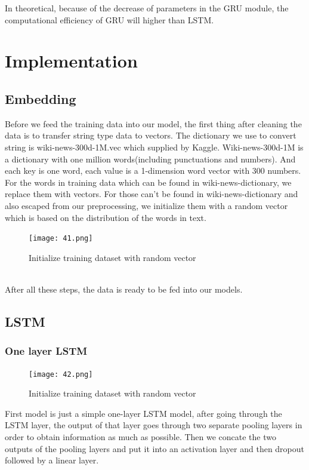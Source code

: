 \documentclass{article}
\begin{document}
\noindent In theoretical, because of the decrease of parameters in the GRU module, the computational efficiency of GRU will higher than LSTM. \\

\section{ Implementation}
\subsection{Embedding}
\noindent Before we feed the training data into our model, the first thing after cleaning the data is to transfer string type data to vectors. The dictionary we use to convert string is wiki-news-300d-1M.vec which supplied by Kaggle. Wiki-news-300d-1M is a dictionary with one million words(including punctuations and numbers). And each key is one word, each value is a 1-dimension  word vector with 300 numbers.\\

\noindent For the words in training data which can  be found in wiki-news-dictionary, we replace them with vectors. For those can’t be found in wiki-news-dictionary and also escaped from our preprocessing, we initialize them with a random vector which is based on the distribution of the words in text.\\
\begin{figure}[h]
	\centering
	\texttt{[image: 41.png]}
	\caption{Initialize training dataset with random vector}
\end{figure}\\
\noindent After all these steps, the data is ready to be fed into our models.\\

\subsection{LSTM}
\subsubsection{One layer LSTM}
\begin{figure}[h]
	\centering
	\texttt{[image: 42.png]}
	\caption{Initialize training dataset with random vector}
\end{figure}
\noindent First model is just a simple one-layer LSTM model, after going through the LSTM layer, the output of that layer goes through two separate pooling layers in order to obtain information as much as possible. Then we concate the two outputs of the pooling layers and put it into an activation layer and then dropout followed by a linear layer.\\
\end{document}
